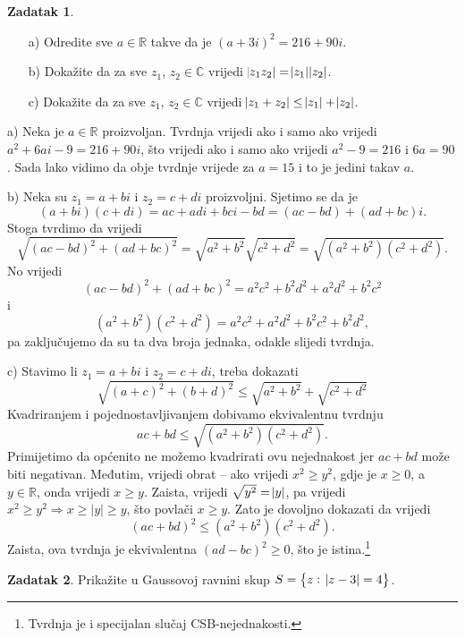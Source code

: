 \documentclass{book}
\let\originalleft\left
\let\originalright\right
\renewcommand{\left}{\mathopen{}\mathclose\bgroup\originalleft}
\renewcommand{\right}{\aftergroup\egroup\originalright}
\renewenvironment{proof}{%
    \vspace{-\parskip}\begin{oldproof}%
    }{%
    \end{oldproof}%
}
\theoremstyle{definition}
\theoremstyle{definition}
\newtheorem{exercise}{Zadatak}
\theoremstyle{remark}
\begin{document}
\begin{exercise}\textbf{}
\begin{itemize}
\item[a)] Odredite sve $a\in \mathbb{R}$ takve da je $(a+3i)^2=216+90i$.
\item[b)] Dokažite da za sve $z_1$, $z_2\in \mathbb{C}$ vrijedi $\abs{z_1z_2}=\abs{z_1}\abs{z_2}$.
\item[c)] Dokažite da za sve $z_1$, $z_2\in \mathbb{C}$ vrijedi $\abs{z_1+z_2}\leq \abs{z_1}+\abs{z_2}$.
\end{itemize}
\end{exercise}
\begin{proof}[Rješenje]
a) Neka je $a\in \mathbb{R}$ proizvoljan. Tvrdnja vrijedi ako i samo ako vrijedi $a^2+6ai-9=216+90i$, što vrijedi ako i samo ako vrijedi $a^2-9=216$ i $6a=90$. Sada lako vidimo da obje tvrdnje vrijede za $a=15$ i to je jedini takav $a$.

b) Neka su $z_1=a+bi$ i $z_2=c+di$ proizvoljni. Sjetimo se da je $$(a+bi)(c+di)=ac+adi+bci-bd=(ac-bd)+(ad+bc)i.$$ Stoga tvrdimo da vrijedi
$$\sqrt{(ac-bd)^2+(ad+bc)^2}=\sqrt{a^2+b^2}\sqrt{c^2+d^2}=\sqrt{(a^2+b^2)(c^2+d^2)}.$$
No vrijedi $$(ac-bd)^2+(ad+bc)^2=a^2c^2+b^2d^2+a^2d^2+b^2c^2$$ 
i 
$$(a^2+b^2)(c^2+d^2)=a^2c^2+a^2d^2+b^2c^2+b^2d^2,$$ pa zaključujemo da su ta dva broja jednaka, odakle slijedi tvrdnja.

c) Stavimo li $z_1=a+bi$ i $z_2=c+di$, treba dokazati
$$\sqrt{(a+c)^2+(b+d)^2}\leq \sqrt{a^2+b^2}+\sqrt{c^2+d^2}$$
Kvadriranjem i pojednostavljivanjem dobivamo ekvivalentnu tvrdnju
$$ac+bd\leq \sqrt{(a^2+b^2)(c^2+d^2)}.$$
Primijetimo da općenito ne možemo kvadrirati ovu nejednakost jer $ac+bd$ može biti negativan. Međutim, vrijedi obrat -- ako vrijedi $x^2\geq y^2$, gdje je $x\geq 0$, a $y\in \mathbb{R}$, onda vrijedi $x\geq y$. Zaista, vrijedi $\sqrt{y^2}=\abs{y}$, pa vrijedi $x^2\geq y^2\Rightarrow x\geq |y|\geq y$, što povlači $x\geq y$. Zato je dovoljno dokazati da vrijedi
$$(ac+bd)^2\leq (a^2+b^2)(c^2+d^2).$$
Zaista, ova tvrdnja je ekvivalentna $(ad-bc)^2\geq 0$, što je istina.\footnote{Tvrdnja je i specijalan slučaj CSB-nejednakosti.}
\end{proof}
\begin{exercise}
Prikažite u Gaussovoj ravnini skup $S=\left\{z :\; \abs{z-3}=4\right\}$.
\end{exercise}
\end{document}

